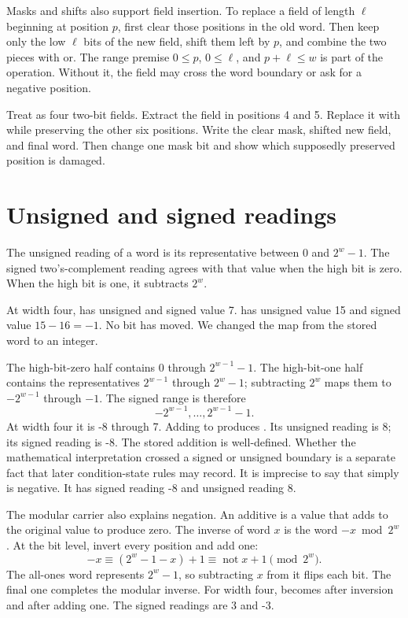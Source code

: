 Masks and shifts also support field insertion. To replace a field of length
\(\ell\) beginning at position \(p\), first clear those positions in the old
word. Then keep only the low \(\ell\) bits of the new field, shift them left
by \(p\), and combine the two pieces with or. The range premise
\(0\leq p\), \(0\leq\ell\), and \(p+\ell\leq w\) is part of the operation.
Without it, the field may cross the word boundary or ask for a negative
position.

\begin{tryit}[title={Extract, change, and insert one field}]
Treat  as four two-bit fields. Extract the field in positions
4 and 5. Replace it with  while preserving the other six positions.
Write the clear mask, shifted new field, and final word. Then change one mask
bit and show which supposedly preserved position is damaged.
\end{tryit}

\section{Unsigned and signed readings}

The unsigned reading of a word is its representative between 0 and
\(2^w-1\). The signed two's-complement reading agrees with that value when the
high bit is zero. When the high bit is one, it subtracts \(2^w\).

At width four,  has unsigned and signed value 7.
 has unsigned value 15 and signed value \(15-16=-1\). No bit has
moved. We changed the map from the stored word to an integer.

The high-bit-zero half contains \(0\) through \(2^{w-1}-1\). The high-bit-one
half contains the representatives \(2^{w-1}\) through \(2^w-1\); subtracting
\(2^w\) maps them to \(-2^{w-1}\) through \(-1\). The signed range is
therefore
\[
  -2^{w-1},\ldots,2^{w-1}-1.
\]
At width four it is -8 through 7. Adding
 to  produces . Its unsigned reading is 8;
its signed reading is -8. The stored addition is well-defined. Whether the
mathematical interpretation crossed a signed or unsigned boundary is a
separate fact that later condition-state rules may record. It is imprecise to
say that  simply is negative. It has signed reading -8 and unsigned
reading 8.

The modular carrier also explains negation. An additive  is a
value that adds to the original value to produce zero. The inverse of word
\(x\) is the word \(-x\bmod 2^w\).
At the bit level, invert every position and add one:
\[
  -x\equiv (2^w-1-x)+1\equiv \mathop{\mathrm{not}}x+1
  \pmod{2^w}.
\]
The all-ones word represents \(2^w-1\), so subtracting \(x\) from it flips
each bit. The final one completes the modular inverse. For width four,
 becomes  after inversion and  after adding
one. The signed readings are 3 and -3.

